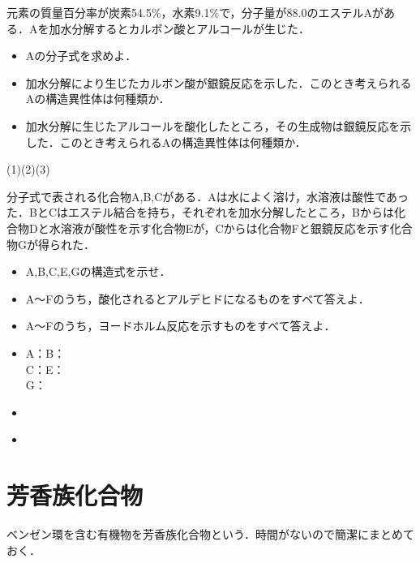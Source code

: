 \documentclass[a4paper,12pt]{ltjsreport}
\begin{document}
\newpage
\begin{que}
元素の質量百分率が炭素54.5$\%$，水素9.1$\%$で，分子量が88.0のエステルAがある．Aを加水分解するとカルボン酸とアルコールが生じた．
\begin{itemize}
    \item[(1)]Aの分子式を求めよ．
    \item [(2)]加水分解により生じたカルボン酸が銀鏡反応を示した．このとき考えられるAの構造異性体は何種類か．
    \item [(3)]加水分解に生じたアルコールを酸化したところ，その生成物は銀鏡反応を示した．このとき考えられるAの構造異性体は何種類か．
\end{itemize}
\end{que}
\ans \noindent (1)\hspace{150pt}(2)\hspace{150pt}(3)
\newpage
\begin{que}
分子式で表される化合物A,B,Cがある．Aは水によく溶け，水溶液は酸性であった．BとCはエステル結合を持ち，それぞれを加水分解したところ，Bからは化合物Dと水溶液が酸性を示す化合物Eが，Cからは化合物Fと銀鏡反応を示す化合物Gが得られた．
\begin{itemize}
    \item [(1)]A,B,C,E,Gの構造式を示せ．
    \item [(2)]A〜Fのうち，酸化されるとアルデヒドになるものをすべて答えよ．
    \item [(3)]A〜Fのうち，ヨードホルム反応を示すものをすべて答えよ．
\end{itemize}
\end{que}
\begin{itemize}
    \item [(1)]A：\hspace{200pt}B：\\[80pt]
    C：\hspace{200pt}E：\\[80pt]
    G：\\[80pt]
    \item [(2)]　\\[15pt]
    \item [(3)]
\end{itemize}
\chapter{芳香族化合物}
ベンゼン環を含む有機物を芳香族化合物という．時間がないので簡潔にまとめておく．
\end{document}
